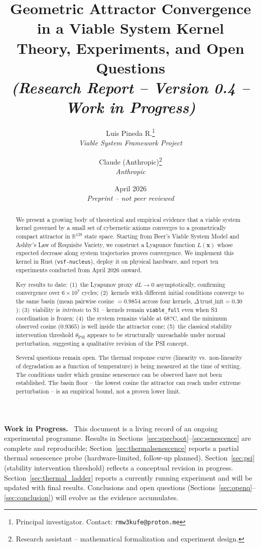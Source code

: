 \documentclass[11pt, a4paper]{article}
\title{%
  \textbf{Geometric Attractor Convergence in a Viable System Kernel}\\[4pt]
  \large Theory, Experiments, and Open Questions\\[2pt]
  \normalsize\textit{(Research Report -- Version 0.4 -- Work in Progress)}
}
\author{
  Luis Pineda R.\thanks{Principal investigator. Contact: \texttt{rmw3kufe@proton.me}} \\[2pt]
  \small\textit{Viable System Framework Project} \\[6pt]
  \and
  Claude (Anthropic)\thanks{Research assistant -- mathematical formalization and experiment design.} \\[2pt]
  \small\textit{Anthropic}
}
\date{April 2026 \\ \small \textit{Preprint -- not peer reviewed}}
\newcommand{\R}{\mathbb{R}}
\newcommand{\sv}{\bm{x}}
\newcommand{\nucleus}{\texttt{vsf-nucleus}}
\newenvironment{wipnotice}{%
  \begin{mdframed}[backgroundcolor=yellow!10,linecolor=orange!70,linewidth=1pt]
  \small\textbf{Work in Progress.}\ }{%
  \end{mdframed}}
\begin{document}
\maketitle

\begin{wipnotice}
This document is a living record of an ongoing experimental programme.
Results in Sections~\ref{sec:specboot}--\ref{sec:senescence} are complete
and reproducible; Section~\ref{sec:thermalsenescence} reports a partial
thermal senescence probe (hardware-limited, follow-up planned).
Section~\ref{sec:psi} (stability intervention threshold) reflects a
conceptual revision in progress.
Section~\ref{sec:thermal_ladder} reports a currently running experiment
and will be updated with final results.
Conclusions and open questions (Sections~\ref{sec:openq}--\ref{sec:conclusion})
will evolve as the evidence accumulates.
\end{wipnotice}

\begin{abstract}
We present a growing body of theoretical and empirical evidence that a viable
system kernel governed by a small set of cybernetic axioms converges to a
geometrically compact attractor in $\R^{128}$ state space.
Starting from Beer's Viable System Model and Ashby's Law of Requisite Variety,
we construct a Lyapunov function $L(\sv)$ whose expected decrease along
system trajectories proves convergence.
We implement this kernel in Rust (\nucleus{}), deploy it on physical hardware,
and report ten experiments conducted from April 2026 onward.

Key results to date:
(1)~the Lyapunov proxy $\overline{dL} \to 0$ asymptotically, confirming
convergence over $6 \times 10^7$ cycles;
(2)~kernels with different initial conditions converge to the same basin
(mean pairwise cosine $= 0.9854$ across four kernels, $\Delta\,\text{trust\_init} = 0.30$);
(3)~viability is \emph{intrinsic} to S1 -- kernels remain \texttt{viable\_full}
even when S3 coordination is frozen;
(4)~the system remains viable at $68?\mathrm{C}$, and the minimum observed
cosine ($0.9365$) is well inside the attractor cone;
(5)~the classical stability intervention threshold $\theta_\text{PSI}$
appears to be structurally unreachable under normal perturbation,
suggesting a qualitative revision of the PSI concept.

Several questions remain open.
The thermal response curve (linearity vs.\ non-linearity of degradation as a
function of temperature) is being measured at the time of writing.
The conditions under which genuine senescence can be observed have not
been established.
The basin floor -- the lowest cosine the attractor can reach under extreme
perturbation -- is an empirical bound, not a proven lower limit.
\end{abstract}
\end{document}
